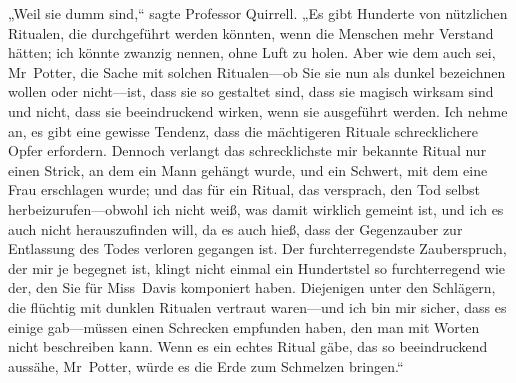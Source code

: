 „Weil sie dumm sind,“ sagte Professor Quirrell. „Es gibt Hunderte von nützlichen Ritualen, die durchgeführt werden könnten, wenn die Menschen mehr Verstand hätten; ich könnte zwanzig nennen, ohne Luft zu holen. Aber wie dem auch sei, Mr~Potter, die Sache mit solchen Ritualen—ob Sie sie nun als dunkel bezeichnen wollen oder nicht—ist, dass sie so gestaltet sind, dass sie magisch wirksam sind und nicht, dass sie beeindruckend wirken, wenn sie ausgeführt werden. Ich nehme an, es gibt eine gewisse Tendenz, dass die mächtigeren Rituale schrecklichere Opfer erfordern. Dennoch verlangt das schrecklichste mir bekannte Ritual nur einen Strick, an dem ein Mann gehängt wurde, und ein Schwert, mit dem eine Frau erschlagen wurde; und das für ein Ritual, das versprach, den Tod selbst herbeizurufen—obwohl ich nicht weiß, was damit wirklich gemeint ist, und ich es auch nicht herauszufinden will, da es auch hieß, dass der Gegenzauber zur Entlassung des Todes verloren gegangen ist. Der furchterregendste Zauberspruch, der mir je begegnet ist, klingt nicht einmal ein Hundertstel so furchterregend wie der, den Sie für Miss~Davis komponiert haben. Diejenigen unter den Schlägern, die flüchtig mit dunklen Ritualen vertraut waren—und ich bin mir sicher, dass es einige gab—müssen einen Schrecken empfunden haben, den man mit Worten nicht beschreiben kann. Wenn es ein echtes Ritual gäbe, das so beeindruckend aussähe, Mr~Potter, würde es die Erde zum Schmelzen bringen.“

